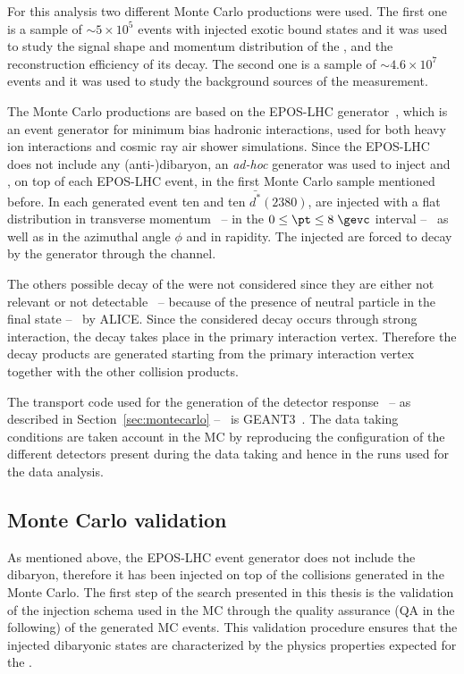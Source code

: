 For this analysis two different Monte Carlo productions were used.
The first one is a sample of $\sim 5 \times 10^{5}$ \pPb events with injected exotic bound states
and it was used to study the signal shape and momentum distribution of the \ds, and the reconstruction
efficiency of its decay.
The second one is a sample of $\sim 4.6 \times 10^{7}$ \pPb events and it was used to study 
the background sources of the measurement.

The Monte Carlo productions are based on the EPOS-LHC generator~\cite{epos_lhc}, which is an event 
generator for minimum bias hadronic interactions, used for both heavy ion interactions and cosmic 
ray air shower simulations.
Since the EPOS-LHC does not include any (anti-)dibaryon, an \textit{ad-hoc} generator was used to
inject \ds and \dsbar, on top of each EPOS-LHC event, in the first Monte Carlo sample mentioned before.
In each generated event ten \dst and ten $\ensuremath{\bar{{d}^{*}}(2380)}$, 
are injected with a flat distribution in transverse momentum \ -- in the $0 \leq \pt \leq 8\;\gevc$ interval
-- \ as well as in the azimuthal angle $\phi$ and in rapidity.
The injected \dst are forced to decay by the generator through the \dstdecay channel. 

The others possible decay of the \dst were not considered since they are either not relevant or not
detectable \ -- because of the presence of neutral particle in the final state -- \ by ALICE.
Since the considered decay occurs through strong interaction, the decay takes place in the primary
interaction vertex. Therefore the decay products are generated starting from the primary interaction vertex
together with the other collision products.

The transport code used for the generation of the detector response \ -- as described
in Section~\ref{sec:montecarlo} -- \ is GEANT3~\cite{geant3}. 
The data taking conditions are taken account in the MC by reproducing the configuration of the different 
detectors present during the data taking and hence in the runs used for the data analysis.

\subsection{Monte Carlo validation} \label{sec:4.2.1}

As mentioned above, the EPOS-LHC event generator does not include the \dst dibaryon, therefore it has
been injected on top of the \pPb collisions generated in the Monte Carlo. 
The first step of the search presented in this thesis is the validation of the injection
schema used in the MC through the quality assurance (QA in the following) of the generated MC events.
This validation procedure ensures that the injected dibaryonic states are characterized by the 
physics properties expected for the \dst.

